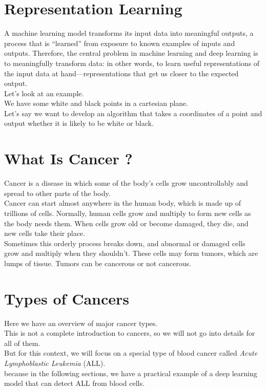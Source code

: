 \documentclass{SBCbookchapter}
\begin{document}
\section*{Representation Learning}
A machine learning model transforms its input data
into meaningful outputs, a process that is “learned” 
from exposure to known examples of inputs and outputs. 
Therefore,  the  central  problem  in  machine  learning
and  deep  learning  is  to meaningfully transform  data:
in  other  words,  to  learn  useful representations
of  the  input  data  at hand—representations that 
get us closer to the expected output. \\
Let's look at an example. \\
We have some white and black points in a cartesian plane. \\
Let's say we want to develop an algorithm that takes a coordinates
of a point and output whether it is likely to be white or black.

\section*{What Is Cancer ?}
Cancer is a disease in which some of the body’s 
cells grow uncontrollably and spread to other parts of the body. \\ 
Cancer can start almost anywhere in the human body, 
which is made up of trillions of cells. Normally, 
human cells grow and multiply to form new cells as the 
body needs them. When cells grow old or become 
damaged, they die, and new cells take their place. \\
Sometimes this orderly process breaks down, and
abnormal or damaged cells grow and multiply when
they shouldn’t. These cells may form tumors, which
are lumps of tissue. Tumors can be cancerous or
not cancerous. 

\section*{Types of Cancers}
Here we have an overview of major cancer types. \\
This is not a complete introduction to cancers, 
so we will not go into details for all of them. \\
But for this context, we will focus on a special type of blood cancer
called \textit{Acute Lymphoblastic Leukemia} (ALL). \\
because in the following sections, we have a practical example
of a deep learning model that can detect ALL from blood cells.
\end{document}
